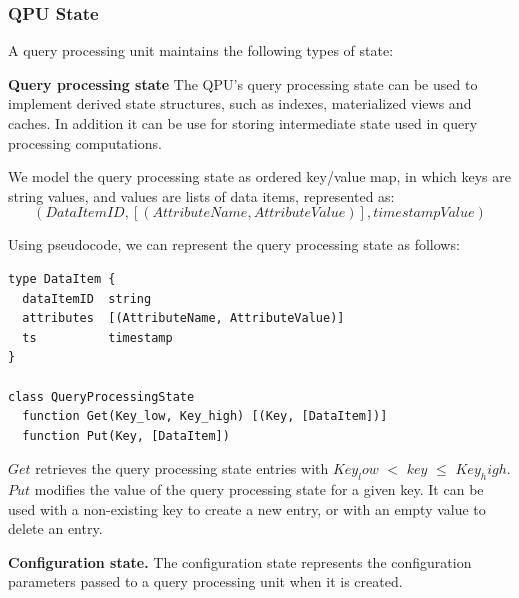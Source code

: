 
\subsubsection{QPU State}

A query processing unit maintains the following types of state:

\medskip
\noindent
\textbf{Query processing state}
The QPU's query processing state can be used to implement derived state structures, such as indexes, materialized views and
caches.
In addition it can be use for storing intermediate state used in query processing computations.

We model the query processing state as ordered key/value map, in which keys are string values, and values are lists of
data items, represented as:
\[
  (DataItemID, [(AttributeName, AttributeValue)], timestampValue)
\]

Using pseudocode, we can represent the query processing state as follows:

\begin{lstlisting}[caption={Pseudocode for the QPU's query processing state},captionpos=b,label={lst:qpustate}]
type DataItem {
  dataItemID  string
  attributes  [(AttributeName, AttributeValue)]
  ts          timestamp
}

class QueryProcessingState
  function Get(Key_low, Key_high) [(Key, [DataItem])]
  function Put(Key, [DataItem])
\end{lstlisting}

$Get$ retrieves the query processing state entries with $Key_low$ $<$ $key$ $\leq$ $Key_high$.
$Put$ modifies the value of the query processing state for a given key.
It can be used with a non-existing key to create a new entry, or with an empty value to delete an entry.

\medskip
\noindent
\textbf{Configuration state.}
The configuration state represents the configuration parameters passed to a query processing unit when it is created.

